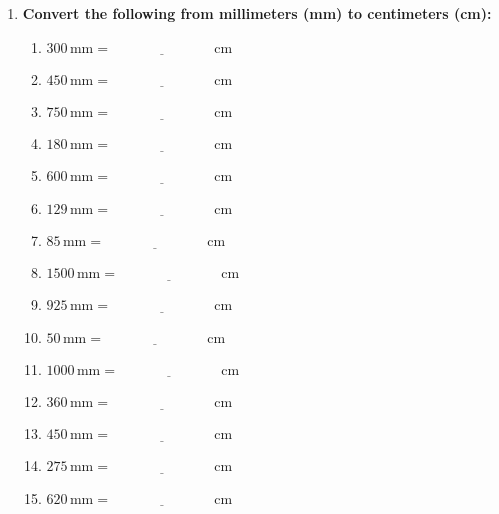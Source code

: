 \documentclass[12pt]{article}
\begin{document}
\begin{enumerate}
    \item \textbf{Convert the following from millimeters (mm) to centimeters (cm):}
    \begin{multicols}{2}
    \begin{enumerate}
        \item \(300 \, \text{mm} = \underline{\hspace{3cm}} \, \text{cm}\)
        \item \(450 \, \text{mm} = \underline{\hspace{3cm}} \, \text{cm}\)
        \item \(750 \, \text{mm} = \underline{\hspace{3cm}} \, \text{cm}\)
        \item \(180 \, \text{mm} = \underline{\hspace{3cm}} \, \text{cm}\)
        \item \(600 \, \text{mm} = \underline{\hspace{3cm}} \, \text{cm}\)
        \item \(129 \, \text{mm} = \underline{\hspace{3cm}} \, \text{cm}\)
        \item \(85 \, \text{mm} = \underline{\hspace{3cm}} \, \text{cm}\)
        \item \(1500 \, \text{mm} = \underline{\hspace{3cm}} \, \text{cm}\)
        \item \(925 \, \text{mm} = \underline{\hspace{3cm}} \, \text{cm}\)
        \item \(50 \, \text{mm} = \underline{\hspace{3cm}} \, \text{cm}\)
        \item \(1000 \, \text{mm} = \underline{\hspace{3cm}} \, \text{cm}\)
        \item \(360 \, \text{mm} = \underline{\hspace{3cm}} \, \text{cm}\)
        \item \(450 \, \text{mm} = \underline{\hspace{3cm}} \, \text{cm}\)
        \item \(275 \, \text{mm} = \underline{\hspace{3cm}} \, \text{cm}\)
        \item \(620 \, \text{mm} = \underline{\hspace{3cm}} \, \text{cm}\)
    \end{enumerate}
    \end{multicols}
\end{enumerate}
\end{document}
